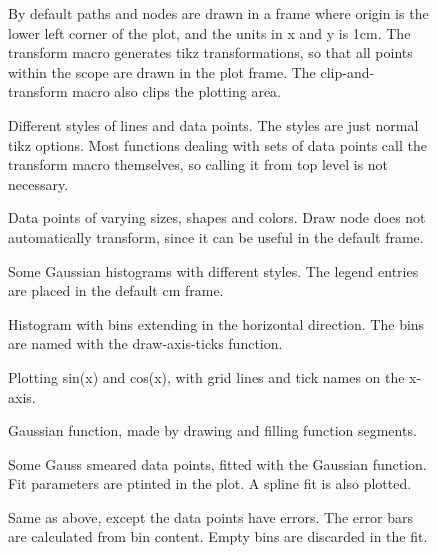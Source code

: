 \documentclass{article}
\begin{document}
\begin{figure}[H]
\centering

\caption{By default paths and nodes are drawn in a frame where origin is the lower left corner of the plot, 
and the units in x and y is 1cm. The transform macro generates tikz transformations, so that all points
within the scope are drawn in the plot frame. The clip-and-transform macro also clips the plotting area.}
\end{figure}
\begin{figure}[H]
\centering

\caption{Different styles of lines and data points. The styles are just normal tikz options. Most functions 
dealing with sets of data points call the transform macro themselves, so calling it from top level is not 
necessary.}
\end{figure}
\begin{figure}[H]
\centering

\caption{Data points of varying sizes, shapes and colors. Draw node does not automatically transform, 
since it can be useful in the default frame.}
\end{figure}
\begin{figure}[H]
\centering

\caption{Some Gaussian histograms with different styles. The legend entries are placed in the default cm frame.}
\end{figure}
\begin{figure}[H]
\centering

\caption{Histogram with bins extending in the horizontal direction. 
The bins are named with the draw-axis-ticks function.}
\end{figure}
\begin{figure}[H]
\centering

\caption{Plotting sin(x) and cos(x), with grid lines and tick names on the x-axis.}
\end{figure}
\begin{figure}[H]
\centering

\caption{Gaussian function, made by drawing and filling function segments.}
\end{figure}
\begin{figure}[H]
\centering

\caption{Some Gauss smeared data points, fitted with the Gaussian function. Fit parameters are ptinted in the plot. 
A spline fit is also plotted.}
\end{figure}
\begin{figure}[H]
\centering

\caption{Same as above, except the data points have errors. The error bars are calculated from bin content.
Empty bins are discarded in the fit.}
\end{figure}
\end{document}
